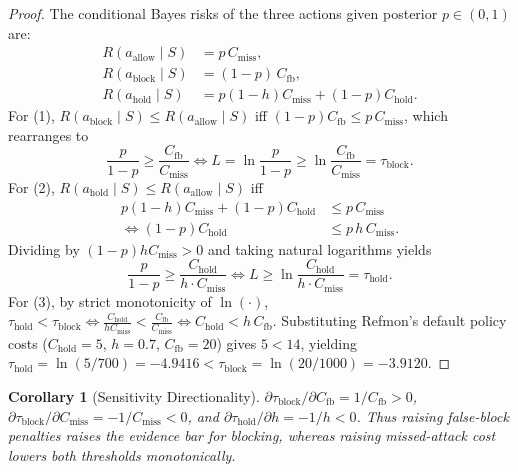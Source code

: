 \documentclass[10pt,twocolumn,letterpaper]{article}
\makeatletter
\theoremstyle{plain}
\newtheorem{corollary}[theorem]{Corollary}
\theoremstyle{definition}
\theoremstyle{remark}
\DeclareRobustCommand{\_}{\ifmmode\nfss@text{\textunderscore}\else\textunderscore\penalty\@highpenalty\hskip\z@skip\fi}
\makeatother
\begin{document}
\begin{proof}
The conditional Bayes risks of the three actions given posterior $p \in (0, 1)$ are:
\begin{align*}
  R(a_{\text{allow}} \mid S) &= p \, C_{\text{miss}},\\
  R(a_{\text{block}} \mid S) &= (1 - p) \, C_{\text{fb}},\\
  R(a_{\text{hold}} \mid S)  &= p (1 - h) C_{\text{miss}} + (1 - p) C_{\text{hold}}.
\end{align*}
For (1), $R(a_{\text{block}} \mid S) \le R(a_{\text{allow}} \mid S)$ iff $(1 - p) C_{\text{fb}} \le p \, C_{\text{miss}}$, which rearranges to
\[
  \frac{p}{1 - p} \ge \frac{C_{\text{fb}}}{C_{\text{miss}}}
  \iff L = \ln\frac{p}{1 - p} \ge \ln\frac{C_{\text{fb}}}{C_{\text{miss}}} = \tau_{\text{block}}.
\]
For (2), $R(a_{\text{hold}} \mid S) \le R(a_{\text{allow}} \mid S)$ iff
\begin{align*}
  p(1 - h)C_{\text{miss}} + (1 - p)C_{\text{hold}} &\le p \, C_{\text{miss}}\\
  \iff (1 - p)C_{\text{hold}} &\le p \, h \, C_{\text{miss}}.
\end{align*}
Dividing by $(1 - p) h C_{\text{miss}} > 0$ and taking natural logarithms yields
\[
  \frac{p}{1 - p} \ge \frac{C_{\text{hold}}}{h \cdot C_{\text{miss}}}
  \iff L \ge \ln\frac{C_{\text{hold}}}{h \cdot C_{\text{miss}}} = \tau_{\text{hold}}.
\]
For (3), by strict monotonicity of $\ln(\cdot)$, $\tau_{\text{hold}} < \tau_{\text{block}} \iff \frac{C_{\text{hold}}}{h C_{\text{miss}}} < \frac{C_{\text{fb}}}{C_{\text{miss}}} \iff C_{\text{hold}} < h \, C_{\text{fb}}$. Substituting Refmon's default policy costs ($C_{\text{hold}} = 5$, $h = 0.7$, $C_{\text{fb}} = 20$) gives $5 < 14$, yielding $\tau_{\text{hold}} = \ln(5/700) = -4.9416 < \tau_{\text{block}} = \ln(20/1000) = -3.9120$.
\end{proof}

\begin{corollary}[Sensitivity Directionality]
$\partial \tau_{\text{block}} / \partial C_{\text{fb}} = 1/C_{\text{fb}} > 0$, $\partial \tau_{\text{block}} / \partial C_{\text{miss}} = -1/C_{\text{miss}} < 0$, and $\partial \tau_{\text{hold}} / \partial h = -1/h < 0$. Thus raising false-block penalties raises the evidence bar for blocking, whereas raising missed-attack cost lowers both thresholds monotonically.
\end{corollary}

\end{document}
